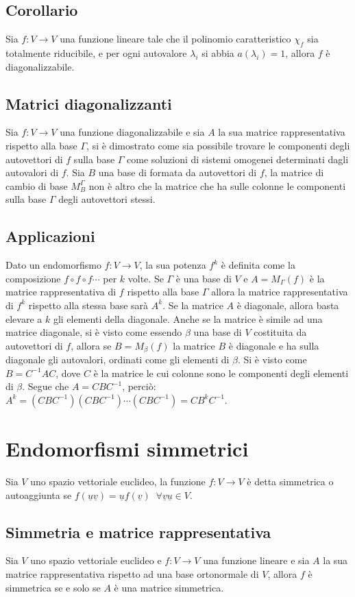 \subsection{Corollario}
Sia $f:V\rightarrow V$ una funzione lineare tale che il polinomio caratteristico $\chi_f$ sia totalmente riducibile, e per ogni autovalore $\lambda_i$ si abbia $a(\lambda_i)=1$, 
allora $f$ \`e diagonalizzabile.
\subsection{Matrici diagonalizzanti}
Sia $f:V\rightarrow V$ una funzione diagonalizzabile e sia $A$ la sua matrice rappresentativa rispetto alla base $\Gamma$, si \`e dimostrato come sia possibile trovare le 
componenti degli autovettori di $f$ sulla base $\Gamma$ come soluzioni di sistemi omogenei determinati dagli autovalori di $f$. Sia $B$ una base di formata da autovettori di $f$, 
la matrice di cambio di base $M_B^\Gamma$ non \`e altro che la matrice che ha sulle colonne le componenti sulla base $\Gamma$ degli autovettori stessi.
\subsection{Applicazioni}
Dato un endomorfismo $f:V\rightarrow V$, la sua potenza $f^k$ \`e definita come la composizione $f\circ f\circ f\cdots$ per $k$ volte. Se $\Gamma$ \`e una base di $V$ e $A=M_
\Gamma(f)$ \`e la matrice rappresentativa di $f$ rispetto alla base $\Gamma$ allora la matrice rappresentativa di $f^k$ rispetto alla stessa base sar\`a $A^k$. Se la matrice $A$ 
\`e diagonale, allora basta elevare a $k$ gli elementi della diagonale. Anche se la matrice \`e simile ad una matrice diagonale, si \`e visto come essendo $\beta$ una base di $V$ 
costituita da autovettori di $f$, allora se $B=M_\beta(f)$ la matrice $B$ \`e diagonale e ha sulla diagonale gli autovalori, ordinati come gli elementi di $\beta$. Si \`e visto
come $B=C^{-1}AC$, dove $C$ \`e la matrice le cui colonne sono le componenti degli elementi di $\beta$. Segue che $A=CBC^{-1}$, perci\`o: $A^k=(CBC^{-1})(CBC^{-1})
\cdots(CBC^{-1})=CB^kC^{-1}$.
\section{Endomorfismi simmetrici}
Sia $V$ uno spazio vettoriale euclideo, la funzione $f:V\rightarrow V$ \`e detta simmetrica o autoaggiunta se $f(\underline{u}\underline{v})=\underline{u}f(\underline{v})\;\;
\forall \underline{v}\underline{u}\in V$.
\subsection{Simmetria e matrice rappresentativa}
Sia $V$ uno spazio vettoriale euclideo e $f:V\rightarrow V$ una funzione lineare e sia $A$ la sua matrice rappresentativa rispetto ad una base ortonormale di $V$, allora $f$ \`e 
simmetrica se e solo se $A$ \`e una matrice simmetrica. 
